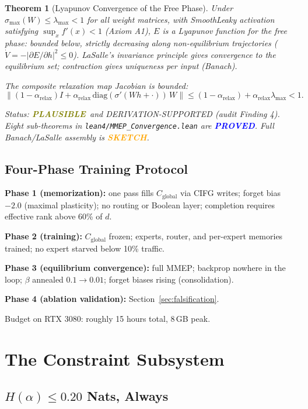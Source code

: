 \documentclass[11pt,letterpaper]{article}
\newtheorem{theorem}{Theorem}[section]
\newcommand{\PROVED}{\textbf{\textcolor{blue}{PROVED}}}
\newcommand{\SKETCH}{\textbf{\textcolor{orange}{SKETCH}}}
\newcommand{\PLAUSIBLE}{\textbf{\textcolor{olive}{PLAUSIBLE}}}
\begin{document}
\begin{theorem}[Lyapunov Convergence of the Free Phase]
\label{thm:convergence}
Under $\sigma_{\max}(W) \leq \lambda_{\max} < 1$ for all weight matrices,
with SmoothLeaky activation satisfying $\sup_x f'(x) < 1$ (Axiom A1),
$E$ is a Lyapunov function for the free phase: bounded below, strictly
decreasing along non-equilibrium trajectories ($\dot{V} = -|\partial E/\partial h|^2 \leq 0$).
LaSalle's invariance principle gives convergence to the equilibrium set;
contraction gives uniqueness per input (Banach).

The composite relaxation map Jacobian is bounded:
\[
\left\|(1-\alpha_{\text{relax}})I + \alpha_{\text{relax}}\,\mathrm{diag}(\sigma'(Wh+\cdot))\,W\right\|
\leq (1-\alpha_{\text{relax}}) + \alpha_{\text{relax}}\lambda_{\max} < 1.
\]

Status: \PLAUSIBLE\ and DERIVATION-SUPPORTED (audit Finding 4).
Eight sub-theorems in \texttt{lean4/MMEP\_Convergence.lean} are \PROVED.
Full Banach/LaSalle assembly is \SKETCH.
\end{theorem}

\subsection{Four-Phase Training Protocol}

\textbf{Phase 1 (memorization):} one pass fills $C_{\text{global}}$ via CIFG
writes; forget bias $-2.0$ (maximal plasticity); no routing or Boolean layer;
completion requires effective rank above 60\% of $d$.

\textbf{Phase 2 (training):} $C_{\text{global}}$ frozen; experts, router, and
per-expert memories trained; no expert starved below 10\% traffic.

\textbf{Phase 3 (equilibrium convergence):} full MMEP; backprop nowhere in the
loop; $\beta$ annealed $0.1 \to 0.01$; forget biases rising (consolidation).

\textbf{Phase 4 (ablation validation):} Section~\ref{sec:falsification}.

Budget on RTX 3080: roughly 15 hours total, 8\,GB peak.

\section{The Constraint Subsystem}
\label{sec:constraints}

\subsection{$H(\alpha) \leq 0.20$ Nats, Always}
\end{document}

